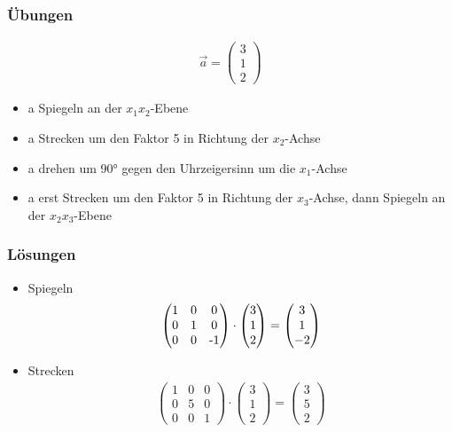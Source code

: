 \begin{frame}
	\frametitle{Übungen}
	\begin{gather*}
	\vec{a} = \begin{pmatrix}
	    3 \\
	    1 \\
	    2
	\end{pmatrix}
	\end{gather*}
	\begin{itemize}
		\item a Spiegeln an der $x_{1}x_{2}$-Ebene
		\item a Strecken um den Faktor 5 in Richtung der $x_{2}$-Achse
		\item a drehen um 90° gegen den Uhrzeigersinn um die $x_{1}$-Achse
		\item a erst Strecken um den Faktor 5 in Richtung der $x_{3}$-Achse, dann Spiegeln an der $x_{2}x_{3}$-Ebene
	\end{itemize}
\end{frame}

\begin{frame}
	\frametitle{Lösungen}
	\begin{itemize}
		\item Spiegeln
		\begin{gather*}
		\begin{pmatrix}
			1 & 0 & 0 \\
			0 & 1 & 0 \\
			0 & 0 & $-1$
			\end{pmatrix} \cdot
			\begin{pmatrix}
				3 \\
				1 \\
				2
			\end{pmatrix} = \begin{pmatrix}
				3 \\
				1 \\
				-2
			\end{pmatrix} \end{gather*}
		\item Strecken
		\begin{gather*} \begin{pmatrix}
			1 & 0 & 0 \\
			0 & 5 & 0 \\
			0 & 0 & 1
			\end{pmatrix} \cdot
			\begin{pmatrix}
				3 \\
				1 \\
				2
			\end{pmatrix} = \begin{pmatrix}
				3 \\
				5 \\
				2
			\end{pmatrix} \end{gather*}
	\end{itemize}
\end{frame}

